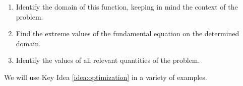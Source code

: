 \addtocounter{keyideacounter}{-1}
{\begin{enumerate}\addtocounter{enumi}{3}
		\item		Identify the domain of this function, keeping in mind the context of the problem.
		\item		Find the extreme values of the fundamental equation on the determined domain.
		\item		Identify the values of all relevant quantities of the problem.
		\end{enumerate}
}

We will use Key Idea \ref{idea:optimization} in a variety of examples.\\

